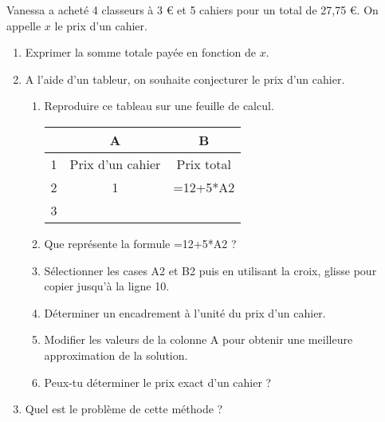 
Vanessa a acheté 4 classeurs à 3 \euro{} et 5 cahiers pour un total de 27,75 €. On appelle $x$ le prix d'un cahier.
\begin{enumerate}
\item Exprimer la somme totale payée en fonction de $x$.
\item A l'aide d'un tableur, on souhaite conjecturer le prix d'un cahier.
\begin{enumerate}
\item Reproduire ce tableau sur une feuille de calcul.

\begin{tabular}{|c|c|c|}
\hline 
&A & B \\ 
\hline 
1&Prix d'un cahier & Prix total \\ 
\hline 
2&1 & =12+5*A2 \\ 
\hline 
3&& \\ 
\hline 
\end{tabular} 
\item Que représente la formule =12+5*A2 ?
\item Sélectionner les cases A2 et B2 puis en utilisant la croix, glisse pour copier jusqu'à la ligne 10.
\item Déterminer un encadrement à l'unité du prix d'un cahier.
\item Modifier les valeurs de la colonne A pour obtenir une meilleure approximation de la solution.
\item Peux-tu déterminer le prix exact d'un cahier ?
\end{enumerate}
\item Quel est le problème de cette méthode ? 
\end{enumerate}